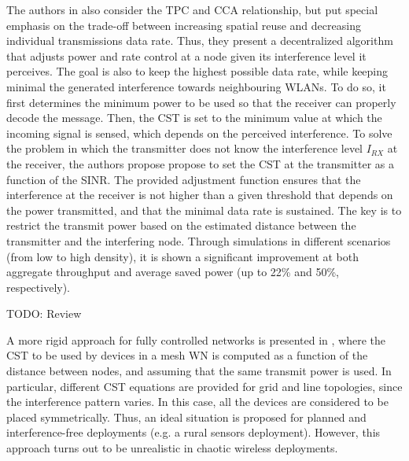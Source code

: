 \documentclass[12pt, a4paper,twoside]{tesi_upf}
\begin{document}
			The authors in \cite{kim2006improving} also consider the TPC and CCA relationship, but put special emphasis on the trade-off between increasing spatial reuse and decreasing individual transmissions data rate. Thus, they present a decentralized algorithm that adjusts power and rate control at a node given its interference level it perceives. The goal is also to keep the highest possible data rate, while keeping minimal the generated interference towards neighbouring WLANs. To do so, it first determines the minimum power to be used so that the receiver can properly decode the message. Then, the CST is set to the minimum value at which the incoming signal is sensed, which depends on the perceived interference. To solve the problem in which the transmitter does not know the interference level $I_{RX}$ at the receiver, the authors propose propose to set the CST at the transmitter as a function of the SINR. The provided adjustment function ensures that the interference at the receiver is not higher than a given threshold that depends on the power transmitted, and that the minimal data rate is sustained. The key is to restrict the transmit power based on the estimated distance between the transmitter and the interfering node. Through simulations in different scenarios (from low to high density), it is shown a significant improvement at both aggregate throughput and average saved power (up to 22\% and 50\%, respectively).
			
			TODO:  Review \cite{oteri2015improved} \cite{jamil2014improving} \cite{zhu2004leveraging}
			
			A more rigid approach for fully controlled networks is presented in \cite{zhu2004leveraging}, where the CST to be used by devices in a mesh WN is computed as a function of the distance between nodes, and assuming that the same transmit power is used. In particular, different CST equations are provided for grid and line topologies, since the interference pattern varies. In this case, all the devices are considered to be placed symmetrically. Thus, an ideal situation is proposed for planned and interference-free deployments (e.g. a rural sensors deployment). However, this approach turns out to be unrealistic in chaotic wireless deployments.
			
\end{document}
